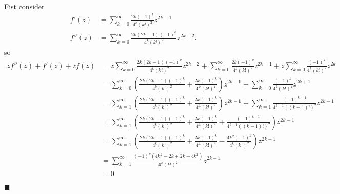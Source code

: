 \documentclass[12pt]{article}
\renewcommand{\qed}{\hfill$\blacksquare$}
\renewenvironment{proof}{\vspace{1em}\begin{addmargin}[2em]{0em}\begin{newproof}}{\end{newproof}\end{addmargin}\qed}
\begin{document}
\begin{proof}
	Fist consider
	\begin{align*}
		f'(z) &= \sum_{k=0}^{\infty} \frac{2k(-1)^k}{4^k(k!)^2}z^{2k-1} \\
		f''(z) &= \sum_{k=0}^{\infty} \frac{2k(2k - 1)(-1)^k}{4^k(k!)^2}z^{2k - 2}.
	\end{align*}
	so
	\begin{align*}
		zf''(z) + f'(z) + zf(z) &= z\sum_{k=0}^{\infty} \frac{2k(2k - 1)(-1)^k}{4^k(k!)^2}z^{2k - 2} + \sum_{k=0}^{\infty} \frac{2k(-1)^k}{4^k(k!)^2}z^{2k-1} + z\sum_{k=0}^{\infty}\frac{(-1)^k}{4^k(k!)^2}z^{2k} \\
		&= \sum_{k=0}^{\infty} \left(\frac{2k(2k - 1)(-1)^k}{4^k(k!)^2} + \frac{2k(-1)^k}{4^k(k!)^2}\right)z^{2k - 1} + \sum_{k=0}^{\infty}\frac{(-1)^{k}}{4^k(k!)^2}z^{2k + 1} \\
		&= \sum_{k=1}^{\infty} \left(\frac{2k(2k - 1)(-1)^k}{4^k(k!)^2} + \frac{2k(-1)^k}{4^k(k!)^2}\right)z^{2k - 1} + \sum_{k=1}^{\infty}\frac{(-1)^{k-1}}{4^{k-1}((k-1)!)^2}z^{2k - 1} \\
		&= \sum_{k=1}^{\infty} \left(\frac{2k(2k - 1)(-1)^k}{4^k(k!)^2} + \frac{2k(-1)^k}{4^k(k!)^2} + \frac{(-1)^{k-1}}{4^{k-1}((k-1)!)^2}\right)z^{2k - 1} \\
		&= \sum_{k=1}^{\infty} \left(\frac{2k(2k - 1)(-1)^k}{4^k(k!)^2} + \frac{2k(-1)^k}{4^k(k!)^2} - \frac{4k^2(-1)^{k}}{4^{k}(k!)^2}\right)z^{2k - 1} \\
		&= \sum_{k=1}^{\infty} \frac{(-1)^k(4k^2 - 2k + 2k - 4k^2)}{4^k(k!)^2}z^{2k-1} \\
		&= 0
	\end{align*}
\end{proof}
\end{document}
